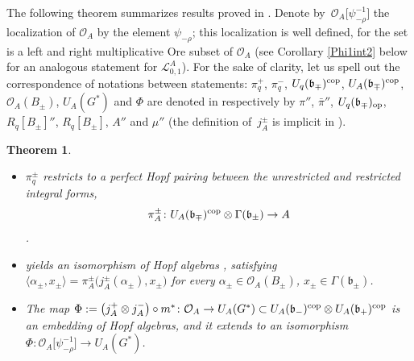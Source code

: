 \documentclass[pdftex]{sigma}
\numberwithin{equation}{section}
\newtheorem{teo}{Theorem}[section]
\theoremstyle{definition}
\newcommand{\mn}{\mathbb{N}}
\newcommand{\Ll}{{\mathcal L}}
\newcommand{\Oo}{{\mathcal O}}
\newcommand{\ra}{\rightarrow}
\begin{document}
The following theorem summarizes results proved in \cite[Sections~3 and~4]{DC-L}. Denote by~$\Oo_{\!A}\!\big[\psi_{-\rho}^{-1}\big]$ the localization of $\Oo_A$ by the element $\psi_{-\rho}$; this localization is well defined, for the set \smash{$\{\psi_{-\rho}^n\}_{n\in \mn}$} is a left and right multiplicative Ore subset of $\Oo_A$ (see Corollary \ref{Phi1int2} below for an analogous statement for $\Ll_{0,1}^A$). For the sake of clarity, let us spell out the correspondence of notations between statements: $\pi^+_q$, $\pi^-_q$, $U_q(\mathfrak{b}_\mp)^{\rm cop}$, $U_A(\mathfrak{b}_\mp)^{\rm cop}$, $\Oo_A(B_\pm)$, $U_A(G^*)$ and $\Phi$ are denoted in \cite{DC-L} respectively by $\pi''$, $\bar{\pi}''$, $U_q(\mathfrak{b}_\mp)_{\rm op}$, $R_q[B_\pm]''$, $R_q[B_\pm]$, $A''$ and $\mu''$ (the definition of~$j_A^\pm$ is implicit in \cite[Section 4.2]{DC-L}).

\begin{teo}\label{Phimap}\quad
\begin{itemize}\itemsep=0pt
\item[$(1)$] $\pi^\pm_q$ restricts to a perfect Hopf pairing between the unrestricted and restricted integral forms, \[\pi^{\pm}_A\colon U_A(\mathfrak{b}_\mp)^{\rm cop}\otimes \Gamma(\mathfrak{b}_\pm)\ra A\].
\item[$(2)$]  yields an isomorphism of Hopf algebras \smash{$j_A^\pm\colon \Oo_A(B_\pm) \!\ra\! U_A(\mathfrak{b}_\mp)^{\rm cop}$}, satisfying $\langle \alpha_\pm,x_\pm\rangle\! = \pi^{\pm}_A\big(j_A^\pm(\alpha_\pm),x_\pm\big)$ for every $\alpha_\pm \in \Oo_A(B_\pm)$, $x_\pm\in \Gamma(\mathfrak{b}_\pm)$.
\item[$(3)$] The map $\Phi := \big(j_A^+\otimes j_A^-\big)\circ m^*\colon \Oo_A \ra U_A(G^*) \subset U_A(\mathfrak{b}_-)^{\rm cop}\otimes U_A(\mathfrak{b}_+)^{\rm cop}$ is an embedding of Hopf algebras, and it extends to an isomorphism $\Phi \colon \Oo_A\big[\psi_{-\rho}^{-1}\big] \ra U_A(G^*)$.
 \end{itemize}
\end{teo}
\end{document}

